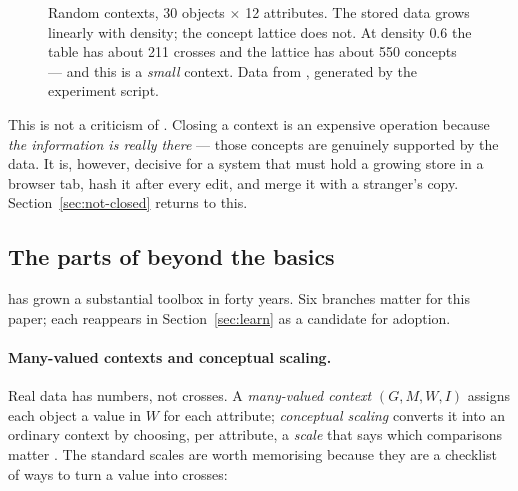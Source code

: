 \begin{figure}[t]
\centering
{}
\caption{Random contexts, 30 objects $\times$ 12 attributes. The stored data
grows linearly with density; the concept lattice does not. At density $0.6$
the table has about 211 crosses and the lattice has about 550 concepts --- and
this is a \emph{small} context. Data from
, generated by the experiment script.}
\label{fig:explosion}
\end{figure}

This is not a criticism of \fca{}. Closing a context is an expensive
operation because \emph{the information is really there} --- those concepts
are genuinely supported by the data. It is, however, decisive for a system
that must hold a growing store in a browser tab, hash it after every edit, and
merge it with a stranger's copy. Section~\ref{sec:not-closed} returns to this.

\subsection{The parts of \fca{} beyond the basics}
\label{sec:fca-extensions}

\fca{} has grown a substantial toolbox in forty years. Six branches matter for
this paper; each reappears in Section~\ref{sec:learn} as a candidate for
adoption.

\paragraph{Many-valued contexts and conceptual scaling.} Real data has
numbers, not crosses. A \emph{many-valued context} $(G, M, W, I)$ assigns each
object a value in $W$ for each attribute; \emph{conceptual scaling} converts
it into an ordinary context by choosing, per attribute, a \emph{scale} that
says which comparisons matter \citep[ch.~1]{ganter1999}. The standard scales
are worth memorising because they are a checklist of ways to turn a value into
crosses:

